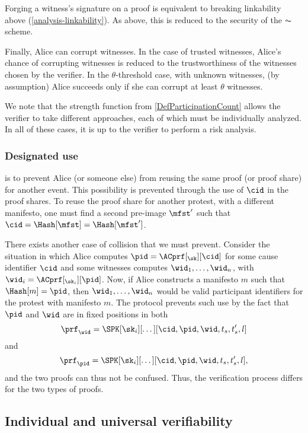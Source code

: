 Forging a witness's signature on a proof is equivalent to breaking linkability 
above (\cref{analysis-linkability}).
As above, this is reduced to the security of the \(\AC\) scheme.

Finally, Alice can corrupt witnesses.
In the case of trusted witnesses, Alice's chance of corrupting witnesses is 
reduced to the trustworthiness of the witnesses chosen by the verifier.
In the \(\theta\)-threshold case, with unknown witnesses, (by assumption) Alice 
succeeds only if she can corrupt at least \(\theta\) witnesses.

We note that the strength function from \cref{DefParticipationCount} allows the 
verifier to take different approaches, each of which must be individually 
analyzed.
In all of these cases, it is up to the verifier to perform a risk analysis.

\subsubsection{Designated use}%
\label{analysis-designated}

 is to prevent Alice (or someone else) from reusing the same proof (or proof share) for another event.
This possibility is prevented through the use of \(\cid\) in the proof shares.
To reuse the proof share for another protest, with a different manifesto, one 
must find a second pre-image \(\mfst'\) such that \(\cid = \Hash[\mfst] = 
  \Hash[\mfst']\).

There exists another case of collision that we must prevent.
Consider the situation in which Alice computes \(\pid = \ACprf[_\sk][\cid]\) for some cause identifier \(\cid\) and some witnesses computes \(\wid_1, \dotsc, \wid_n\), with \(\wid_i = \ACprf[_{\sk_i}][\pid]\).
Now, if Alice constructs a manifesto \(m\) such that \(\Hash[m] = \pid\), then \(\wid_1, \dotsc, \wid_n\) would be valid participant identifiers for the protest with manifesto \(m\).
The protocol prevents such use by the fact that \(\pid\) and \(\wid\) are in 
fixed positions in both \[
  \prf_{\wid} = \SPK[\sk_i][\dotsc][\cid, \pid, \wid, t_s, t_s', l]
\] and \[
  \prf_{\pid} = \SPK[\sk_i][\dotsc][\cid, \pid, \wid, t_s, t_s', l],
\] and the two proofs can thus not be confused.
Thus, the verification process differs for the two types of proofs.

\subsection{Individual and universal verifiability}%
\label{analysis-individual}%
\label{analysis-universal}

